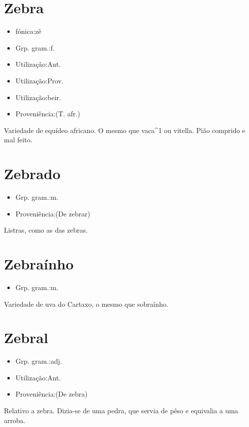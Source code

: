 \section{Zebra}
\begin{itemize}
\item {fónica:zê}
\end{itemize}
\begin{itemize}
\item {Grp. gram.:f.}
\end{itemize}
\begin{itemize}
\item {Utilização:Ant.}
\end{itemize}
\begin{itemize}
\item {Utilização:Prov.}
\end{itemize}
\begin{itemize}
\item {Utilização:beir.}
\end{itemize}
\begin{itemize}
\item {Proveniência:(T. afr.)}
\end{itemize}
Variedade de equídeo africano.
O mesmo que \textunderscore vaca\textunderscore ^1 ou \textunderscore vitella\textunderscore .
Pião comprido e mal feito.
\section{Zebrado}
\begin{itemize}
\item {Grp. gram.:m.}
\end{itemize}
\begin{itemize}
\item {Proveniência:(De \textunderscore zebrar\textunderscore )}
\end{itemize}
Listras, como as das zebras.
\section{Zebraínho}
\begin{itemize}
\item {Grp. gram.:m.}
\end{itemize}
Variedade de uva do Cartaxo, o mesmo que \textunderscore sobraínho\textunderscore .
\section{Zebral}
\begin{itemize}
\item {Grp. gram.:adj.}
\end{itemize}
\begin{itemize}
\item {Utilização:Ant.}
\end{itemize}
\begin{itemize}
\item {Proveniência:(De \textunderscore zebra\textunderscore )}
\end{itemize}
Relativo a zebra.
Dizia-se de uma pedra, que servia de pêso e equivalia a uma arroba.
